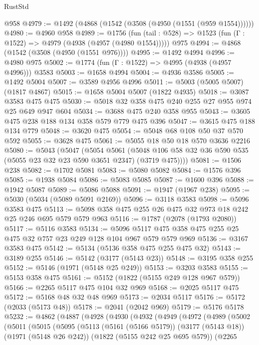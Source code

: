 \begin{lexlean}{RustStd}
\begin{coremodule}
{\begin{coremodule}
{{{{{{{{{{{{{    @958
@4979 := @1492 (@4868 (@1542 (@3508 (@4950 (@1551 (@959 @1554))))))
@4980 := @4960 @958
@4989 := @1756
    (fun (tail : @528) => @1523 (fun (Γ : @1522) => @4979 (@4938 (@4957 (@4980 @1554)))))
    @975
@4994 := @4868 (@1542 (@3508 (@4950 (@1551 @976))))
@4995 := @1492 @4994
@4996 := @4980 @975
@5002 := @1774 (fun (Γ : @1522) => @4995 (@4938 (@4957 @4996))) @3583
@5003 := @1658 @4994
@5004 := @4936 @3586
@5005 := @1492 @5004
@5007 := @3589 @4956 @4996
@5011 := @5003 (@5005 @5007) (@1817 @4867)
@5015 := @1658 @5004 @5007 (@1822 @4935)
@5018 := @3087 @3583 @475 @475
@5030 := @5018 @32 @358 @475 @240 @255 @27 @955 @974 @25 @649 @947 @604
@5034 := @3688 @475 @240 @358 @955
@5043 := @3605 @475 @238 @188 @134 @358 @579 @779 @475 @396
@5047 := @3615 @475 @188 @134 @779
@5048 := @3620 @475
@5054 := @5048 @68 @108 @50 @37 @570 @592
@5055 := @3628 @475
@5061 := @5055 @18 @50 @18 @570 @3636 @2216
@5080 := @5043
    (@5047
      (@5054
        @5061
        (@5048 @106 @58 @32 @36 @590 @535 (@5055 @23 @32 @23 @590 @3651 @2347) (@3719 @475))))
@5081 := @1506 @238
@5082 := @1702 @5081
@5083 := @5080 @5082
@5084 := @1576 @396
@5085 := @1938 @5084
@5086 := @5083 @5085
@5087 := @1600 @396
@5088 := @1942 @5087
@5089 := @5086 @5088
@5091 := @1947 (@1967 @238)
@5095 := @5030 (@5034 (@5089 @5091 @2169))
@5096 := @3118 @3583
@5098 := @5096 @3583 @475
@5113 := @5098 @358 @475 @255 @26 @475 @32 @973 @18 @242 @25 @246 @695 @579 @579 @963
@5116 := @1787 (@2078 (@1793 @2080))
@5117 := @5116 @3583
@5134 := @5096 @5117 @475 @358 @475 @255 @25 @475 @32 @757 @23 @249 @128 @104 @967 @579 @579 @969
@5136 := @3167 @3583 @475
@5142 := @5134 (@5136 @358 @475 @255 @475 @32)
@5143 := @3189 @255
@5146 := @5142 (@3177 (@5143 @23))
@5148 := @3195 @358 @255
@5152 := @5146 (@1971 (@5148 @25 @249))
@5153 := @3203 @3583
@5155 := @5153 @358 @475
@5161 := @5152 (@1822 (@5155 @249 @128 @967 @579))
@5166 := @2265 @5117 @475 @104 @32 @969
@5168 := @2025 @5117 @475
@5172 := @5168 @48 @32 @48 @969
@5173 := @2034 @5117
@5176 := @5172 (@2033 (@5173 @48))
@5178 := @2041 (@2042 @969)
@5179 := @5176 @5178
@5232 := @4862
    (@4887
      (@4928
        (@4930
          (@4932
            (@4949
              (@4972
                (@4989
                  (@5002
                    (@5011
                      (@5015
                        (@5095
                          (@5113
                            (@5161 (@5166 @5179))
                            (@3177 (@5143 @18))
                            (@1971 (@5148 @26 @242))
                            (@1822 (@5155 @242 @25 @695 @579))
                            (@2265
}}}}}}}}}}}}}
\end{coremodule}}
\end{coremodule}
\end{lexlean}
